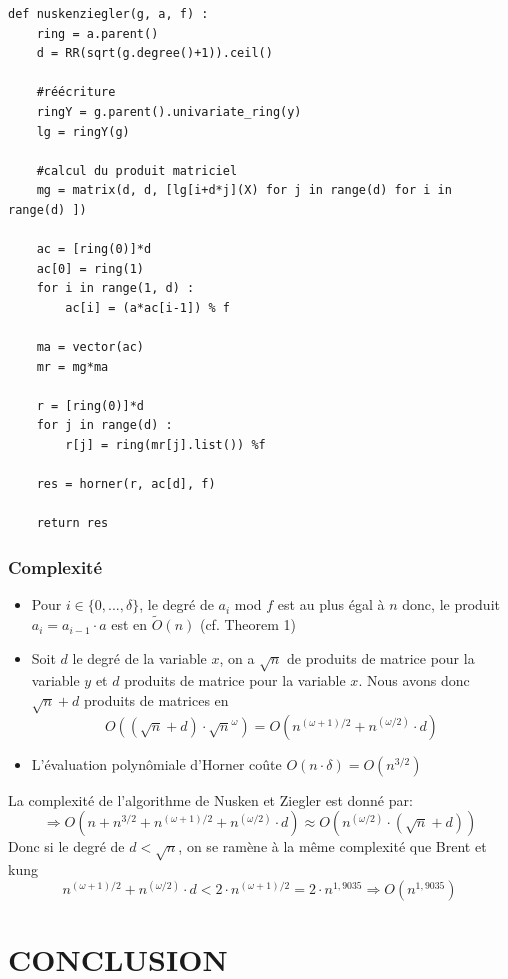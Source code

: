 \documentclass[a4paper]{article}
\begin{document}
\bigskip

\begin{lstlisting}[title={nusken et ziegler}]
def nuskenziegler(g, a, f) :
    ring = a.parent()
    d = RR(sqrt(g.degree()+1)).ceil()

    #réécriture
    ringY = g.parent().univariate_ring(y)
    lg = ringY(g)

    #calcul du produit matriciel
    mg = matrix(d, d, [lg[i+d*j](X) for j in range(d) for i in range(d) ])

    ac = [ring(0)]*d
    ac[0] = ring(1)
    for i in range(1, d) :
        ac[i] = (a*ac[i-1]) % f

    ma = vector(ac)
    mr = mg*ma

    r = [ring(0)]*d
    for j in range(d) :
        r[j] = ring(mr[j].list()) %f
    
    res = horner(r, ac[d], f)

    return res
\end{lstlisting}

\newpage
\subsubsection*{Complexité}
\begin{itemize}
    \item Pour $i \in \{0,...,\delta\}$, le degré de $a_i$ mod $f$ est au plus égal à $n$ donc, le produit $a_i=a_{i-1}\cdot a$ est en $\tilde{O}(n)$ (cf. Theorem 1)
    \item Soit $d$ le degré de la variable $x$, on a $\sqrt{n}$ de produits de matrice pour la variable $y$ et $d$ produits de matrice pour la variable $x$.
    Nous avons donc $\sqrt{n} + d$ produits de matrices en $$O((\sqrt{n}+d)\cdot \sqrt{n}^{\omega})=O(n^{(\omega+1)/2} + n^{(\omega/2)}\cdot d)$$ 
    \item L'évaluation polynômiale d'Horner coûte $O(n\cdot \delta)=O(n^{3/2})$
\end{itemize}
La complexité de l'algorithme de Nusken et Ziegler est donné par:
\[
\Longrightarrow O(n + n^{3/2} + n^{(\omega+1)/2} + n^{(\omega/2)}\cdot d) \approx O(n^{(\omega/2)}\cdot (\sqrt{n}+d))
\]
Donc si le degré de $d<\sqrt{n}$, on se ramène à la même complexité que Brent et kung
\[
n^{(\omega+1)/2} + n^{(\omega/2)}\cdot d < 2\cdot {n}^{(\omega+1)/2} = 2\cdot {n}^{1,9035} \Longrightarrow O(n^{1,9035})
\]


\section{CONCLUSION}
\end{document}
